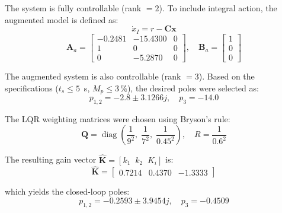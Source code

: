 \documentclass[conference]{IEEEtran}
\begin{document}
The system is fully controllable (rank $=2$). To include integral action, the augmented model is defined as:
\begin{equation}
  \dot{x}_I = r - \mathbf{C}\mathbf{x}
\end{equation}
\begin{equation}
  \mathbf{A}_a =
  \begin{bmatrix}
  -0.2481 & -15.4300 & 0 \\
  1 & 0 & 0 \\
  0 & -5.2870 & 0
  \end{bmatrix}, \quad
  \mathbf{B}_a =
  \begin{bmatrix}
  1 \\ 0 \\ 0
  \end{bmatrix}
\end{equation}

The augmented system is also controllable (rank $=3$). Based on the specifications ($t_s \leq 5$~s, $M_p \leq 3\,\%$), the desired poles were selected as:
\begin{equation}
  p_{1,2} = -2.8 \pm 3.1266j, \quad p_3 = -14.0
\end{equation}

The LQR weighting matrices were chosen using Bryson's rule:
\begin{equation}
  \mathbf{Q} = \operatorname{diag}\!\left(\frac{1}{9^2},\;\frac{1}{7^2},\;\frac{1}{0.45^2}\right), \quad
  R = \frac{1}{0.6^2}
\end{equation}

The resulting gain vector $\hat{\mathbf{K}} = [k_1\;\;k_2\;\;K_i]$ is:
\begin{equation}
  \hat{\mathbf{K}} = \begin{bmatrix} 0.7214 & 0.4370 & -1.3333 \end{bmatrix}
\end{equation}

which yields the closed-loop poles:
\begin{equation}
  p_{1,2} = -0.2593 \pm 3.9454j, \quad p_3 = -0.4509
\end{equation}

\end{document}
